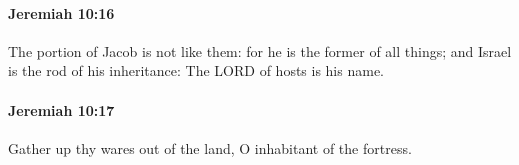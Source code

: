		\paragraph{Jeremiah 10:16} %
			\label{JEREMIAH-10-16}

			The portion of Jacob is not like them: for he is the former of all things; and Israel is the rod of his inheritance: The LORD of hosts is his name.


		\paragraph{Jeremiah 10:17} %
			\label{JEREMIAH-10-17}

			Gather up thy wares out of the land, O inhabitant of the fortress.


